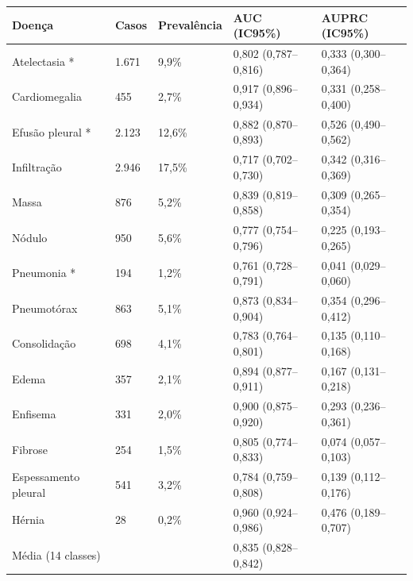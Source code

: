 \begin{tabular}{lllll}
\toprule
Doença & Casos & Prevalência & AUC (IC95\%) & AUPRC (IC95\%) \\
\midrule
Atelectasia * & 1.671 & 9,9\% & 0,802 (0,787–0,816) & 0,333 (0,300–0,364) \\
Cardiomegalia & 455 & 2,7\% & 0,917 (0,896–0,934) & 0,331 (0,258–0,400) \\
Efusão pleural * & 2.123 & 12,6\% & 0,882 (0,870–0,893) & 0,526 (0,490–0,562) \\
Infiltração & 2.946 & 17,5\% & 0,717 (0,702–0,730) & 0,342 (0,316–0,369) \\
Massa & 876 & 5,2\% & 0,839 (0,819–0,858) & 0,309 (0,265–0,354) \\
Nódulo & 950 & 5,6\% & 0,777 (0,754–0,796) & 0,225 (0,193–0,265) \\
Pneumonia * & 194 & 1,2\% & 0,761 (0,728–0,791) & 0,041 (0,029–0,060) \\
Pneumotórax & 863 & 5,1\% & 0,873 (0,834–0,904) & 0,354 (0,296–0,412) \\
Consolidação & 698 & 4,1\% & 0,783 (0,764–0,801) & 0,135 (0,110–0,168) \\
Edema & 357 & 2,1\% & 0,894 (0,877–0,911) & 0,167 (0,131–0,218) \\
Enfisema & 331 & 2,0\% & 0,900 (0,875–0,920) & 0,293 (0,236–0,361) \\
Fibrose & 254 & 1,5\% & 0,805 (0,774–0,833) & 0,074 (0,057–0,103) \\
Espessamento pleural & 541 & 3,2\% & 0,784 (0,759–0,808) & 0,139 (0,112–0,176) \\
Hérnia & 28 & 0,2\% & 0,960 (0,924–0,986) & 0,476 (0,189–0,707) \\
Média (14 classes) &  &  & 0,835 (0,828–0,842) &  \\
\bottomrule
\end{tabular}
